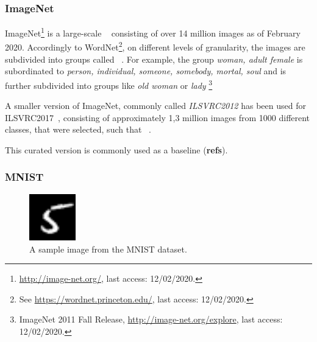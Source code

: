 \subsubsection{ImageNet}\label{ssec:imagenet}

ImageNet\footnote{\href{http://image-net.org/}{http://image-net.org/}, last access: 12/02/2020.} is a large-scale ~\citep{imagenet_cvpr09} consisting of over 14 million images as of February 2020.
Accordingly to WordNet\footnote{See \href{https://wordnet.princeton.edu/}{https://wordnet.princeton.edu/}, last access: 12/02/2020.}, on different levels of granularity, the images are subdivided into groups called ~\citep{imagenet_cvpr09}.
For example, the group \textit{woman, adult female} is subordinated to \textit{person, individual, someone, somebody, mortal, soul} and is further subdivided into groups like \textit{old woman} or \textit{lady} \footnote{ImageNet 2011 Fall Release, \href{http://image-net.org/explore}{http://image-net.org/explore}, last access: 12/02/2020.}

A smaller version of ImageNet, commonly called \textit{ILSVRC2012} has been used for \ac{ILSVRC2017}~\citep{ILSVRC15}, consisting of approximately 1,3 million images from 1000 different classes, that were selected, such that ~\citep{imagenet_cvpr09}.

This curated version is commonly used as a baseline (\textbf{refs}).

\subsubsection{MNIST}\label{subsubsec:mnist}

\begin{figure}
    \begin{center}
        \includegraphics[width=0.18\textwidth]{images/mnist_sample.png}
    \end{center}
    \caption[MNIST dataset sample image]{A sample image from the MNIST dataset.}
    \label{fig:mnist_sample}
\end{figure}

